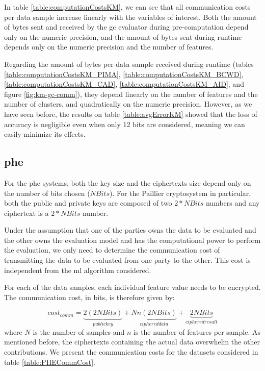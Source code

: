 In table \ref{table:computationCostsKM}, we can see that all communication costs per data sample increase linearly with the variables of interest. Both the amount of bytes sent and received by the \ac{gc} evaluator during pre-computation depend only on the numeric precision, and the amount of bytes sent during runtime depends only on the numeric precision and the number of features.

Regarding the amount of bytes per data sample received during runtime (tables \ref{table:computationCostsKM_PIMA}, \ref{table:computationCostsKM_BCWD}, \ref{table:computationCostsKM_CAD}, \ref{table:computationCostsKM_AID}, and figure \ref{fig:km-gc-comm}), they depend linearly on the number of features and the number of clusters, and quadratically on the numeric precision. However, as we have seen before, the results on table \ref{table:avgErrorKM} showed that the loss of accuracy is negligible even when only 12 bits are considered, meaning we can easily minimize its effects.


\subsection{\acl{phe}}

For the \ac{phe} systems, both the key size and the ciphertexts size depend only on the number of bits chosen ($NBits$). For the Paillier cryptosystem in particular, both the public and private keys are composed of two $2*NBits$ numbers and any ciphertext is a $2*NBits$ number.

Under the assumption that one of the parties owns the data to be evaluated and the other owns the evaluation model and has the computational power to perform the evaluation, we only need to determine the communication cost of transmitting the data to be evaluated from one party to the other. This cost is independent from the \ac{ml} algorithm considered.

For each of the data samples, each individual feature value needs to be encrypted. The communication cost, in bits, is therefore given by:

\begin{equation}
\label{eq:PHE_commCost}
cost_{comm} = \underbrace{2(2NBits)}_{public key} + \underbrace{Nn(2NBits)}_{ciphered data} + \underbrace{2NBits}_{ciphered result} 
\end{equation}
where $N$ is the number of samples and $n$ is the number of features per sample. As mentioned before, the ciphertexts containing the actual data overwhelm the other contributions. We present the communication costs for the datasets considered in table \ref{table:PHECommCost}.

